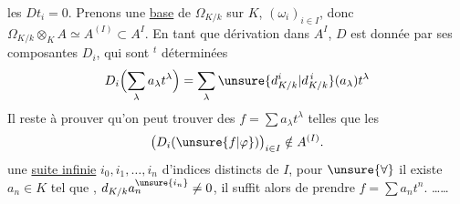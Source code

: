 
les $Dt_i=0$.  Prenons une
\uline{base} de $\Omega_{K/k}$ sur $K$,  $(\omega_i)_{i\in I}$,
donc $\Omega_{K/k}\otimes_K A\simeq A^{(I)}\subset A^I$. En tant
que dérivation dans $A^I$, $D$ est donnée
par ses composantes $D_i$, qui sont
$^t$ déterminées
\[
D_i\Bigl(\sum_\lambda a_\lambda t^\lambda\Bigr)
=\sum_\lambda \unsure{d^i_{K/k}|d_{K/k}^{\,i}}(a_\lambda)t^\lambda
\]
Il reste à prouver qu'on peut trouver
des $f=\sum a_\lambda t^\lambda$ telles que les
\[
\bigl(D_i(\unsure{f|\varphi})\bigr)_{i\in I}\notin A^{(I)}.
\]
une \uline{suite infinie} $i_0,i_1,\ldots,i_n$
d'indices distincts de $I$,  pour $\unsure{\forall}$
 il existe $a_n\in K$ tel que
,
$d_{K/k}a_n^{\unsure{i_n}}\ne0$, il suffit alors de
prendre $f=\sum a_nt^n$. \ldots\ldots

